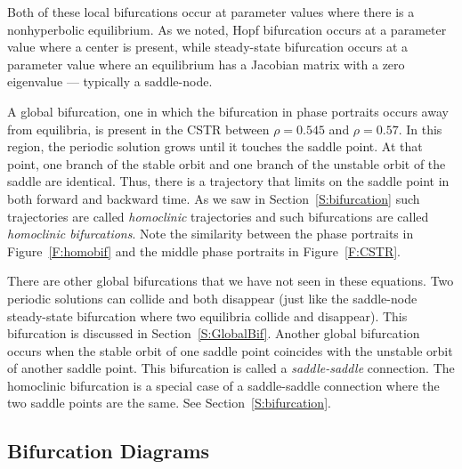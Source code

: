 Both of these local bifurcations occur at parameter values where
there is a nonhyperbolic equilibrium. As we noted, Hopf
bifurcation occurs at a parameter value where a center is
present, while steady-state bifurcation occurs at a parameter value where 
an equilibrium has a Jacobian matrix with a zero eigenvalue --- typically 
a saddle-node.  

A global bifurcation, one in which the bifurcation
in phase portraits occurs away from equilibria, is present in the CSTR 
between $\rho=0.545$ and $\rho=0.57$.  In this region, the periodic solution 
grows until it touches the saddle point.  At that point, one branch of 
the stable orbit and one branch of the unstable orbit of the 
saddle are identical.  Thus, there is a trajectory that limits
on the saddle point in both forward and backward time.  As we 
saw in Section~\ref{S:bifurcation} such trajectories are called 
{\em homoclinic\/} trajectories and such bifurcations are called 
{\em homoclinic bifurcations\/}.   
  Note the similarity between the phase 
portraits in Figure~\ref{F:homobif} and the middle phase portraits in 
Figure~\ref{F:CSTR}.

There are other global bifurcations that we have not seen in 
these equations.  Two periodic solutions can collide and both 
disappear (just like the saddle-node steady-state bifurcation 
where two equilibria collide and disappear).  This bifurcation is
discussed in Section~\ref{S:GlobalBif}.  Another global 
bifurcation occurs when the stable orbit of one saddle point 
coincides with the unstable orbit of another saddle point.  
This bifurcation is called a {\em saddle-saddle\/} connection.  
The homoclinic bifurcation is a special case of a saddle-saddle 
connection where the two saddle points are the same.
  See Section~\ref{S:bifurcation}.

\subsection*{Bifurcation Diagrams}


